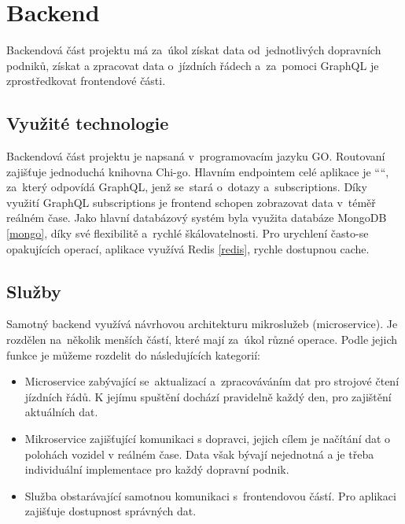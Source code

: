 \section{Backend}
Backendová část projektu má za~úkol získat data od~jednotlivých dopravních podniků, získat a zpracovat data o~jízdních řádech \cite{cisjr} a~za~pomoci GraphQL je zprostředkovat frontendové části.
\subsection{Využité technologie} Backendová část projektu je napsaná v~programovacím jazyku GO. Routovaní zajišťuje jednoduchá knihovna Chi-go. Hlavním endpointem celé aplikace je ““, za~který odpovídá GraphQL, jenž se~stará o~dotazy a~subscriptions. Díky využití GraphQL subscriptions je frontend schopen zobrazovat data v~téměř reálném čase. Jako hlavní databázový systém byla využita databáze MongoDB \ref{mongo}, díky své flexibilitě a~rychlé škálovatelnosti. Pro urychlení často-se opakujících operací, aplikace využívá Redis \ref{redis}, rychle dostupnou cache. \par
\subsection{Služby}
Samotný backend využívá návrhovou architekturu mikroslužeb (microservice). Je rozdělen na~několik menších částí, které mají za~úkol různé operace. Podle jejich funkce je můžeme rozdelit do následujících kategorií:

\begin{itemize}
    \item Microservice zabývající se~aktualizací a~zpracováváním dat pro strojové čtení jízdních řádů. K jejímu spuštění dochází pravidelně každý den, pro zajištění aktuálních dat.
    \item Mikroservice zajišťující komunikaci s dopravci, jejich cílem je načítání dat o polohách vozidel v reálném čase. Data však bývají nejednotná a je třeba individuální implementace pro každý dopravní podnik.
    \item Služba obstarávající samotnou komunikaci s~frontendovou částí. Pro aplikaci zajišťuje dostupnost správných dat.
\end{itemize}
